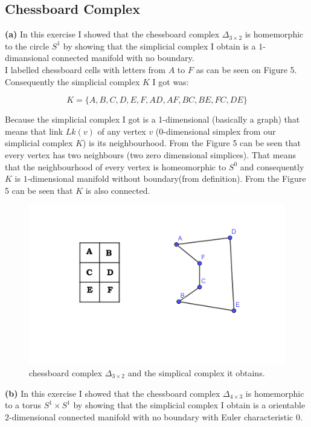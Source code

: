 \documentclass[12pt]{article}
\begin{document}
	\subsection{Chessboard Complex}
	\textbf{(a)} In this exercise I showed that the chessboard complex $\Delta_{3 \times 2}$ is homemorphic to the circle $S^1$ by showing that the simplicial complex I obtain is a $1$-dimansional connected manifold with no boundary.  \\
	
	I labelled chessboard cells with letters from $A$ to $F$ as can be seen on Figure 5. Consequently the simplicial complex $K$ I got was: 
	
	$$K = \{A,B,C,D,E,F,AD,AF,BC,BE,FC,DE\}$$
	
	Because the simplicial complex I got is a 1-dimensional (basically a graph) that means that link $Lk(v)$ of any vertex $v$ (0-dimensional simplex from our  simplicial complex $K$) is its neighbourhood. From the Figure 5 can be seen that every vertex has two neighbours (two zero dimensional simplices). That means that the neighbourhood of every vertex is homeomorphic to $S^0$ and consequently $K$ is $1$-dimensional manifold without boundary(from definition). From the Figure 5 can be seen that $K$ is also connected. \\
	
	\begin{figure}
		\centering
		\includegraphics[scale=0.20] {graf5}
		\caption{\label{fig:5}chessboard complex $\Delta_{3 \times 2}$ and the simplical complex it obtains. }
	\end{figure}
	
	
	\textbf{(b)}  In this exercise I showed that the chessboard complex $\Delta_{4 \times 3}$ is homemorphic to a torus $S^1 \times S^1$ by showing that the simplicial complex I obtain is a orientable $2$-dimensional connected manifold with no boundary with Euler characteristic 0.  \\
	
\end{document}
